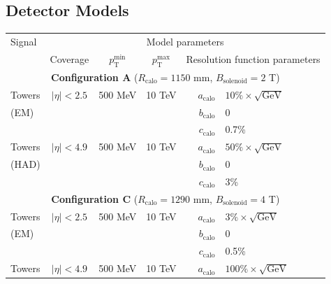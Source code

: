 \documentclass[11pt,letterpaper]{article}
\newcommand{\GeV}{\text{GeV}}
\newcommand{\ptmin}{\ensuremath{p_{\text{T}}^{\text{min}}}}
\newcommand{\ptmax}{\ensuremath{p_{\text{T}}^{\text{max}}}}
\newcommand{\acalo}{\ensuremath{a_{\text{calo}}}}
\newcommand{\bcalo}{\ensuremath{b_{\text{calo}}}}
\newcommand{\ccalo}{\ensuremath{c_{\text{calo}}}}
\begin{document}
\subsection{Detector Models}\label{sec:det_model}





\begin{table}\centering
\renewcommand{\arraystretch}{1.25}
\begin{tabular}{|l|c|c|c|r@{\ =\ }l|}
\hline
Signal  & \multicolumn{5}{c|}{Model parameters}    \\ \cline{2-6}                      
        & Coverage
        & \ptmin
        & \ptmax 
        & \multicolumn{2}{c|}{Resolution function parameters} \\
\hline
\multicolumn{6}{|c|}{\textbf{Configuration A} ($R_{\text{calo}} = 1150$ mm, $B_{\text{solenoid}} = 2$ T)} \\
\hline
Towers     & $|\eta| < 2.5$ & 500 MeV &  10 TeV   & \acalo & $10\%\times\sqrt{\GeV}$                  \\ 
(EM)       &                &         &           & \bcalo & 0                                        \\
           &                &         &           & \ccalo & 0.7\%                                    \\
Towers     & $|\eta| < 4.9$ & 500 MeV &  10 TeV   & \acalo & $50\%\times\sqrt{\GeV}$                  \\
(HAD)      &                &         &           & \bcalo & 0                                        \\
           &                &         &           & \ccalo & 3\%                                      \\
\hline 
\multicolumn{6}{|c|}{\textbf{Configuration C} ($R_{\text{calo}} = 1290$ mm, $B_{\text{solenoid}} = 4$ T)} \\
\hline
Towers     & $|\eta| < 2.5$ & 500 MeV &  10 TeV   & \acalo & $3\%\times\sqrt{\GeV}$                   \\
(EM)       &                &         &           & \bcalo & 0                                        \\
           &                &         &           & \ccalo & 0.5\%                                    \\
Towers     & $|\eta| < 4.9$ & 500 MeV &  10 TeV   & \acalo & $100\%\times\sqrt{\GeV}$                 \\

\end{tabular}
\end{table}
\end{document}
